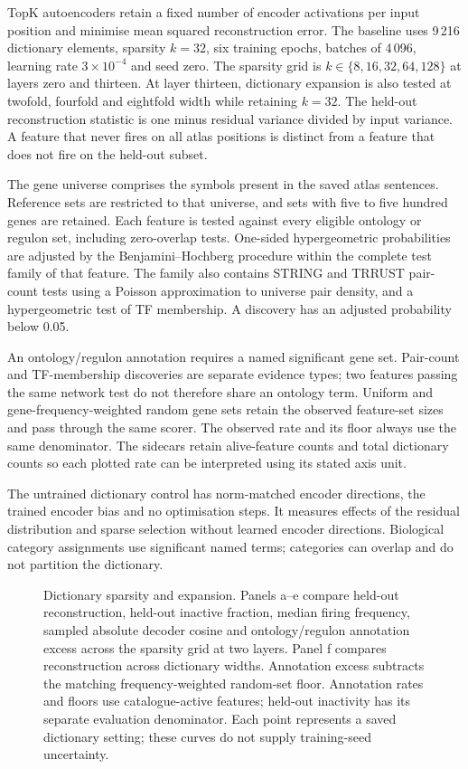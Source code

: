 \documentclass[11pt]{article}
\begin{document}
TopK autoencoders retain a fixed number of encoder activations per input position and minimise
mean squared reconstruction error. The baseline uses 9\,216 dictionary elements, sparsity
$k=32$, six training epochs, batches of 4\,096, learning rate $3\times10^{-4}$ and seed zero.
The sparsity grid is $k\in\{8,16,32,64,128\}$ at layers zero and thirteen. At layer thirteen,
dictionary expansion is also tested at twofold, fourfold and eightfold width while retaining
$k=32$. The held-out reconstruction statistic is one minus residual variance divided by input
variance. A feature that never fires on all atlas positions is distinct from a feature that
does not fire on the held-out subset.

The gene universe comprises the symbols present in the saved atlas sentences. Reference sets
are restricted to that universe, and sets with five to five hundred genes are retained. Each
feature is tested against every eligible ontology or regulon set, including zero-overlap tests.
One-sided hypergeometric probabilities are adjusted by the Benjamini--Hochberg procedure within
the complete test family of that feature. The family also contains STRING and TRRUST pair-count
tests using a Poisson approximation to universe pair density, and a hypergeometric test of TF
membership. A discovery has an adjusted probability below 0.05.

An ontology/regulon annotation requires a named significant gene set. Pair-count and TF-membership
discoveries are separate evidence types; two features passing the same network test do not
therefore share an ontology term. Uniform and gene-frequency-weighted random gene sets retain
the observed feature-set sizes and pass through the same scorer. The observed rate and its
floor always use the same denominator. The sidecars retain alive-feature counts and total
dictionary counts so each plotted rate can be interpreted using its stated axis unit.

The untrained dictionary control has norm-matched encoder directions, the trained encoder bias
and no optimisation steps. It measures effects of the residual distribution and sparse selection
without learned encoder directions. Biological category assignments use significant named terms;
categories can overlap and do not partition the dictionary.


\clearpage


\begin{figure}[p]
\centering
\caption{Dictionary sparsity and expansion. Panels a--e compare held-out reconstruction, held-out
inactive fraction, median firing frequency, sampled absolute decoder cosine and ontology/regulon
annotation excess across the sparsity grid at two layers. Panel f compares reconstruction across
dictionary widths. Annotation excess subtracts the matching frequency-weighted random-set floor.
Annotation rates and floors use catalogue-active features; held-out inactivity has its separate
evaluation denominator.
Each point represents a saved dictionary setting; these curves do not supply training-seed uncertainty.}
\label{fig:sparsity}
\end{figure}
\clearpage
\end{document}
